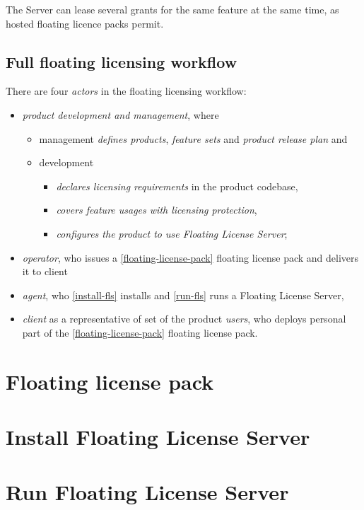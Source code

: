 \documentclass[12pt]{report}
\begin{document}
The Server can lease several grants for the same feature at the same time, as hosted floating licence packs permit.

\section*{Full floating licensing workflow}

There are four \textit{actors} in the floating licensing workflow:

\begin{itemize}

	\item \textit{product development and management}, where
		\begin{itemize}
		    \item management \textit{defines products}, \textit{feature sets} and \textit{product release plan} and
		    \item development
		    	\begin{itemize}
		      		\item \textit{declares licensing requirements} in the product codebase,
		      		\item  \textit{covers feature usages with licensing protection},
		      		\item  \textit{configures the product to use Floating License Server};
		      	\end{itemize}
      	\end{itemize}
	\item \textit{operator}, who issues a \ref{floating-license-pack} floating license pack and delivers it to client
	\item \textit{agent}, who \ref{install-fls} installs and \ref{run-fls} runs a Floating License Server,
	\item \textit{client} as a representative of set of the product \textit{users}, who 
    deploys personal part of the \ref{floating-license-pack} floating license pack.

\end{itemize} 

\chapter*{Floating license pack} \label{floating-license-pack}

\chapter*{Install Floating License Server} \label{install-fls}

\chapter*{Run Floating License Server} \label{run-fls}
\end{document}
